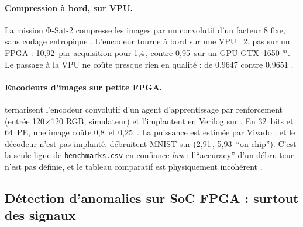 \paragraph{Compression à bord, sur VPU.} La mission Φ-Sat-2
\citep{2023-guerrisi-artificial-intelligence-board-image-compression} compresse les images
par un  convolutif d'un facteur 8 fixe, sans codage entropique . L'encodeur
tourne à bord sur une VPU ~2, pas sur un FPGA : 10,92\, par acquisition pour
1,4\,, contre 0,95\, sur un GPU GTX~1650 $^{m}$. Le passage à la VPU ne
coûte presque rien en qualité :  de 0,9647 contre 0,9651 .

\paragraph{Encodeurs d'images sur petite FPGA.}
\citet{2021-manjunath-energy-efficient-edgeai-autoencoder-accelerator} ternarisent
l'encodeur convolutif d'un agent d'apprentissage par renforcement (entrée 120$\times$120
RGB, simulateur) et l'implantent en Verilog sur . En 32~bits et 64~PE, une image
coûte 0,8\, et 0,25\, . La puissance est estimée par Vivado
, et le décodeur n'est pas implanté.
\citet{arxiv-2301.07050-energy-efficient-reconfigurable-autoencoder-implementation}\pp{}
débruitent MNIST sur  (2,91\,, 5,93\, \enquote{on-chip}). C'est la seule ligne
de \texttt{benchmarks.csv} en confiance \emph{low} : l'\enquote{accuracy} d'un débruiteur
n'est pas définie, et le tableau comparatif est physiquement incohérent .

\subsection{Détection d'anomalies sur SoC FPGA : surtout des signaux}

